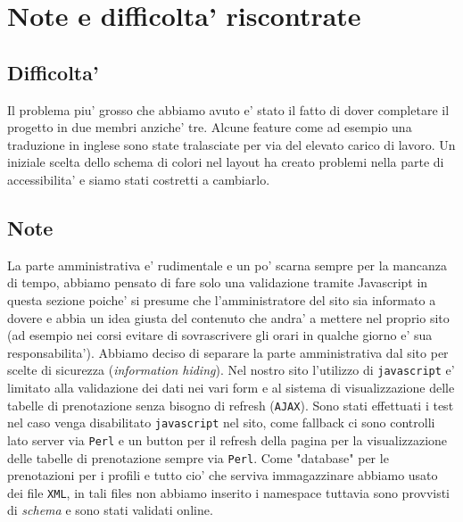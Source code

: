 \section{Note e difficolta' riscontrate}
\subsection{Difficolta'}
Il problema piu' grosso che abbiamo avuto e' stato il fatto di dover completare il progetto in due membri anziche' tre.
Alcune feature come ad esempio una traduzione in inglese sono state tralasciate per via del elevato carico di lavoro.\newline
Un iniziale scelta dello schema di colori nel layout ha creato problemi nella parte di accessibilita' e siamo stati costretti a cambiarlo.

\subsection{Note}
La parte amministrativa e' rudimentale e un po' scarna sempre per la mancanza di tempo, abbiamo pensato di fare solo una validazione tramite Javascript in questa sezione poiche' si presume che l'amministratore del sito sia informato a dovere e abbia un idea giusta del contenuto che andra' a mettere nel proprio sito (ad esempio nei corsi evitare di sovrascrivere gli orari in qualche giorno e' sua responsabilita').\newline
Abbiamo deciso di separare la parte amministrativa dal sito per scelte di sicurezza (\textit{information hiding}).
Nel nostro sito l'utilizzo di \texttt{javascript} e' limitato alla validazione dei dati nei vari form e al sistema di visualizzazione delle tabelle di prenotazione senza bisogno di refresh (\texttt{AJAX}).\newline
Sono stati effettuati i test nel caso venga disabilitato \texttt{javascript} nel sito, come fallback ci sono controlli lato server via \texttt{Perl} e un button per il refresh della pagina per la visualizzazione delle tabelle di prenotazione sempre via \texttt{Perl}.\newline 
Come "database" per le prenotazioni per i profili e tutto cio' che serviva immagazzinare abbiamo usato dei file \texttt{XML}, in tali files non abbiamo inserito i namespace tuttavia sono provvisti di \textit{schema} e sono stati validati online. 
